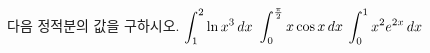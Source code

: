 다음 정적분의 값을 구하시오.
 $\displaystyle\int_{1}^{2}\ln x^3\mkern3mu dx$
 $\displaystyle\int_{0}^{\frac{\pi}{2}}x\cos x\mkern3mu dx$
 $\displaystyle\int_{0}^{1}x^2e^{2x}\mkern3mu dx$
